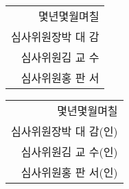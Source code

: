 \documentclass[a4paper]{article}
\makeatletter
\newenvironment{myepigraph}
{\par\hfill
	\begin{tabular}{@{}r@{\hspace{20mm}}}%
	}%
	{%
	\end{tabular}\par\medskip}
\def\apprvsignone{parkdaegam.png}	%
\def\apprvsigntwo{ntieaK.png}		%
\def\apprvsignthree{hongpanseo.png}	%
\def\apprvsign{(인)}
\newlength{\apprvsignonewidth}
\newlength{\apprvsigntwowidth}
\newlength{\apprvsignthreewidth}
\newlength{\apprvsignoneheight}
\newlength{\apprvsigntwoheight}
\newlength{\apprvsignthreeheight}
\newlength{\apprvsignwidth}
\makeatother
\begin{document}
	
	\vspace*{3em}
	
	\begin{myepigraph}
		{\Large {몇년몇월며칠}}\\[11mm]
		{\Large 
		심사위원장\hspace{5mm}박 대 감\hspace{6mm}%
		\trimbox{%
			{4.4mm} {\apprvsignoneheight/2} %
			{\apprvsignonewidth-\apprvsignwidth-1mm-2.67mm} %
			{\apprvsignoneheight/2}}
		{%
			\begin{tikzpicture}
			\draw (\apprvsignonewidth/2-\apprvsignwidth-1mm,0) 
			node {%
				\includegraphics[height=\apprvsignoneheight]%
				{\apprvsignone}};
				\draw (0,0) node {\apprvsign};
			\end{tikzpicture}}%
		}\\[8mm]
		{\Large 
		심사위원\hspace{5mm}김 교 수\hspace{6mm}%
		\trimbox{%
			{4.4mm} {\apprvsigntwoheight/2} %
			{\apprvsigntwowidth-\apprvsignwidth-1mm-2.67mm} %
			{\apprvsigntwoheight/2}}
		{%
			\begin{tikzpicture}
			\draw (\apprvsigntwowidth/2-\apprvsignwidth-1mm,0) 
			node {%
				\includegraphics[height=\apprvsigntwoheight]%
				{\apprvsigntwo}%
			};
				\draw (0,0) node {\apprvsign};
			\end{tikzpicture}}%
		}\\[8mm]
		{\Large 
		심사위원\hspace{5mm}홍 판 서\hspace{6mm}%
		\trimbox{%
			{4.4mm} {\apprvsignthreeheight/2} %
			{\apprvsignthreewidth-\apprvsignwidth-1mm-2.67mm} %
			{\apprvsignthreeheight/2}}
		{%
			\begin{tikzpicture}
			\draw (\apprvsignthreewidth/2-\apprvsignwidth-1mm,0) 
			node {%
				\includegraphics[height=\apprvsignthreeheight]%
				{\apprvsignthree}};
				\draw (0,0) node {\apprvsign};
			\end{tikzpicture}}%
		}
	\end{myepigraph}


	\vspace{3em}

	\begin{myepigraph}
	{\Large {몇년몇월며칠}}\\[11mm]
	{\Large 심사위원장\hspace{5mm}박 대 감\hspace{6mm}(인)}\\[8mm]
	{\Large 심사위원\hspace{5mm}김 교 수\hspace{6mm}(인)}\\[8mm]
	{\Large 심사위원\hspace{5mm}홍 판 서\hspace{6mm}(인)}
	\end{myepigraph}
\end{document}
